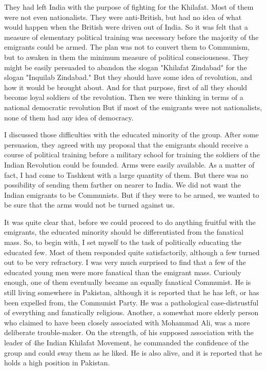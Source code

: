 They had left India with the purpose of fighting for the Khilafat. Most of them were not even nationalists. They were anti-British, but had no idea of what would happen when the British were driven out of India. So it was felt that a measure of elementary political training was necessary before the majority of the emigrants could be armed. The plan was not to convert them to Communism, but to awaken in them the minimum measure of political consciousness. They might be easily persuaded to abandon the slogan "Khilafat Zindabad" for the slogan "Inquilab Zindabad." But they should have some idea of revolution, and how it would be brought about. And for that purpose, first of all they should become loyal soldiers of the revolution. Then we were thinking in terms of a national democratic revolution But if most of the emigrants were not nationalists, none of them had any idea of democracy. 

I discussed those difficulties with the educated minority of the group. After some persuasion, they agreed with my proposal that the emigrants should receive a course of political training before a military school for training the soldiers of the Indian Revolution could be founded. Arms were easily available. As a matter of fact, I had come to Tashkent with a large quantity of them. But there was no possibility of 
sending them farther on nearer to India. We did not want the Indian emigrants to be Communists. But if they were to be armed, we wanted to be sure that the arms would not be turned against us. 

It was quite clear that, before we could proceed to do anything fruitful with the emigrants, the educated minority should be differentiated from the fanatical mass. So, to begin with, I set myself to the task of politically educating the educated few. Most of them responded quite satisfactorily, although a few turned out to be very refractory. I was very much surprised to find that a few of the educated young men were more fanatical than the emigrant mass. Curiouly enough, one of them eventually became an equally fanatical Communist. He is still living somewhere in Pakistan, although it is reported that he has left, or has been expelled from, the Communist Party. He was a pathological case-distrustful of everything and fanatically religious. Another, a somewhat more elderly person who claimed to have been closely associated with Mohammad Ali, was a more deliberate trouble-maker. On the strength, of his supposed association with the leader of 4he Indian Khilafat 
Movement, he commanded the confidence of the group and could sway them as he liked. He is also alive, and it is reported that he holds a high position in Pakistan. 

